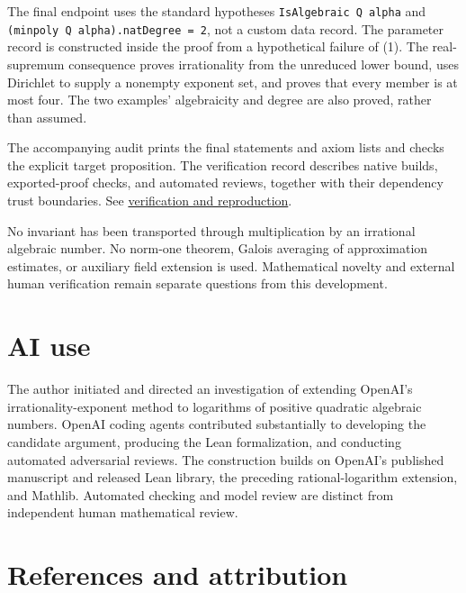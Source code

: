 \documentclass[11pt]{article}
\begin{document}
The final endpoint uses the standard hypotheses
\texttt{IsAlgebraic Q alpha} and
\texttt{(minpoly Q alpha).natDegree = 2}, not a custom data record. The
parameter record is constructed inside the proof from a hypothetical
failure of (1). The real-supremum consequence proves irrationality from
the unreduced lower bound, uses Dirichlet to supply a nonempty exponent
set, and proves that every member is at most four. The two examples'
algebraicity and degree are also proved, rather than assumed.

The accompanying audit prints the final statements and axiom lists and
checks the explicit target proposition. The verification record
describes native builds, exported-proof checks, and automated reviews,
together with their dependency trust boundaries. See
\href{VERIFY.md}{verification and reproduction}.

No invariant has been transported through multiplication by an
irrational algebraic number. No norm-one theorem, Galois averaging of
approximation estimates, or auxiliary field extension is used.
Mathematical novelty and external human verification remain separate
questions from this development.

\section{AI use}\label{ai-use}

The author initiated and directed an investigation of extending OpenAI's
irrationality-exponent method to logarithms of positive quadratic
algebraic numbers. OpenAI coding agents contributed substantially to
developing the candidate argument, producing the Lean formalization, and
conducting automated adversarial reviews. The construction builds on
OpenAI's published manuscript and released Lean library, the preceding
rational-logarithm extension, and Mathlib. Automated checking and model
review are distinct from independent human mathematical review.

\section{References and attribution}\label{references-and-attribution}
\end{document}
